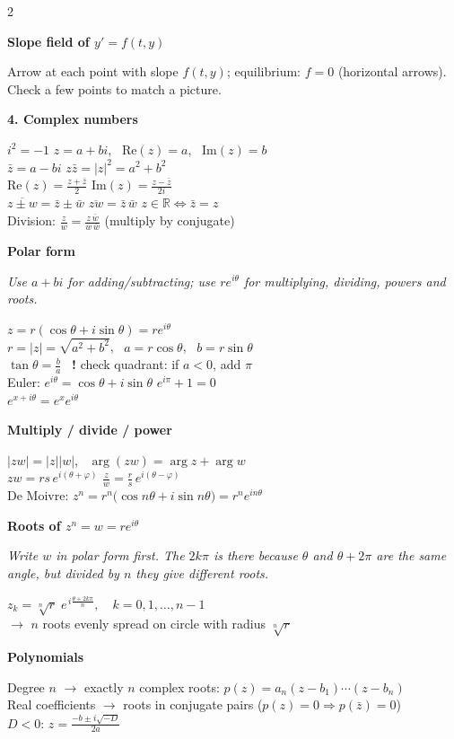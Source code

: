 \documentclass[10pt]{article}
\newcommand{\sect}[2]{%
  \par\vspace{12pt}\noindent                      %
  \colorbox{#1}{\parbox{\dimexpr\columnwidth-2\fboxsep}{\color{white}\bfseries #2}}%
  \par\vspace{4pt}}                               %
\newcommand{\sub}[1]{\par\vspace{7pt}\textbf{#1}\par\vspace{2pt}}  %
\newcommand{\expl}[1]{{\color{gray!80!black}\itshape #1}\par}
\newcommand{\warn}[1]{{\color{BrickRed}\textbf{!} #1}}
\begin{document}
\begin{multicols}{2}
\sub{Slope field of $y'=f(t,y)$}
Arrow at each point with slope $f(t,y)$; equilibrium: $f=0$ (horizontal arrows). Check a few points to match a picture.

\sect{cCplx}{4. Complex numbers}
$i^2=-1$ \quad $z=a+bi$, \ $\mathrm{Re}(z)=a$, \ $\mathrm{Im}(z)=b$\\
$\bar z=a-bi$ \quad $z\bar z=|z|^2=a^2+b^2$\\
$\mathrm{Re}(z)=\frac{z+\bar z}{2}$ \quad $\mathrm{Im}(z)=\frac{z-\bar z}{2i}$\\
$\overline{z\pm w}=\bar z\pm\bar w$ \quad $\overline{zw}=\bar z\,\bar w$ \quad $z\in\mathbb R\Leftrightarrow\bar z=z$\\
Division: $\frac zw=\frac{z\,\bar w}{w\,\bar w}$ (multiply by conjugate)

\sub{Polar form}
\expl{Use $a+bi$ for adding/subtracting; use $re^{i\theta}$ for multiplying, dividing, powers and roots.}
$z=r(\cos\theta+i\sin\theta)=re^{i\theta}$\\
$r=|z|=\sqrt{a^2+b^2}$, \ $a=r\cos\theta$, \ $b=r\sin\theta$\\
$\tan\theta=\frac ba$ \ \warn{check quadrant: if $a<0$, add $\pi$}\\
Euler: $e^{i\theta}=\cos\theta+i\sin\theta$ \quad $e^{i\pi}+1=0$\\
$e^{x+i\theta}=e^x e^{i\theta}$

\sub{Multiply / divide / power}
$|zw|=|z||w|$, \ $\arg(zw)=\arg z+\arg w$\\
$zw=rs\,e^{i(\theta+\varphi)}$ \quad $\frac zw=\frac rs\,e^{i(\theta-\varphi)}$\\
De Moivre: $z^n=r^n\big(\cos n\theta+i\sin n\theta\big)=r^ne^{in\theta}$

\sub{Roots of $z^n=w=re^{i\theta}$}
\expl{Write $w$ in polar form first. The $2k\pi$ is there because $\theta$ and $\theta+2\pi$ are the same angle, but divided by $n$ they give different roots.}
$\displaystyle z_k=\sqrt[n]{r}\;e^{\,i\frac{\theta+2k\pi}{n}},\quad k=0,1,\dots,n-1$\\
$\rightarrow$ $n$ roots evenly spread on circle with radius $\sqrt[n]r$

\sub{Polynomials}
Degree $n$ $\rightarrow$ exactly $n$ complex roots: $p(z)=a_n(z-b_1)\cdots(z-b_n)$\\
Real coefficients $\rightarrow$ roots in conjugate pairs ($p(z)=0\Rightarrow p(\bar z)=0$)\\
$D<0$: $z=\frac{-b\pm i\sqrt{-D}}{2a}$


\end{multicols}
\end{document}
